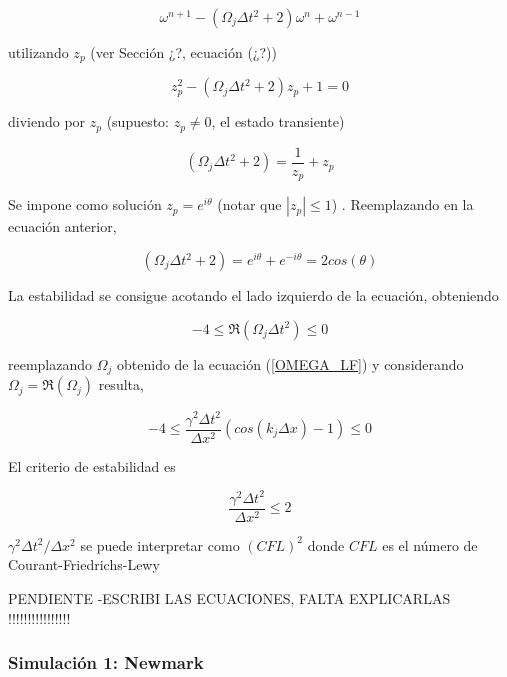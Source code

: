 \begin{equation}
\omega^{n+1} - (\Omega_j \Delta t^2 +2) \omega^n + \omega^{n-1}
\end{equation}

utilizando $z_p$ (ver Sección ¿?, ecuación (¿?))

\begin{equation}
z_p^2 - \left( \Omega_j \Delta t^2 +2 \right) z_p + 1 = 0
\end{equation}

diviendo por $z_p$ (supuesto: $z_p \neq 0$, el estado transiente)

\begin{equation}
\left( \Omega_j \Delta t^2 + 2 \right) = \dfrac{1}{z_p} + z_p
\end{equation}

Se impone como solución $z_p = e^{i \theta}$ (notar que $|z_p| \leq 1$) . Reemplazando en la ecuación anterior,

\begin{equation}
\left( \Omega_j \Delta t^2 + 2 \right) = e^{i \theta} + e^{-i \theta} = 2 cos(\theta)
\end{equation}

La estabilidad se consigue acotando el lado izquierdo de la ecuación, obteniendo

\begin{equation}
-4 \leq \Re(\Omega_j \Delta t^2) \leq 0 
\end{equation}

reemplazando $\Omega_j$ obtenido de la ecuación (\ref{OMEGA_LF}) y considerando $\Omega_j = \Re (\Omega_j)$ resulta,

\begin{equation}
-4 \leq \dfrac{\gamma^2 \Delta t^2}{\Delta x^2} \left( cos(k_j \Delta x) - 1 \right)  \leq 0
\end{equation}

El criterio de estabilidad es

\begin{equation}
\dfrac{\gamma^2 \Delta t^2}{\Delta x^2} \leq 2
\end{equation}

$\gamma^2 \Delta t^2 / \Delta x^2 $ se puede interpretar como $(CFL)^2$ donde $CFL$ es el número de Courant-Friedrichs-Lewy

PENDIENTE -ESCRIBI LAS ECUACIONES, FALTA EXPLICARLAS !!!!!!!!!!!!!!!!

\subsubsection{Simulación 1: Newmark}

